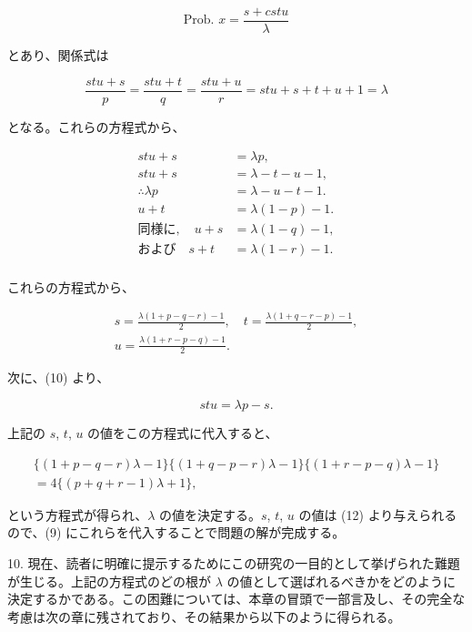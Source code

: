 \documentclass[a4paper,11pt,openany]{ltjsbook}
\begin{document}
\[
  \text{Prob. } x = \frac{s + cstu}{\lambda} \tag{9}
\]

とあり、関係式は

\[
  \frac{stu + s}{p} = \frac{stu + t}{q} = \frac{stu + u}{r} = stu + s + t + u + 1 = \lambda \tag{10}
\]

となる。これらの方程式から、

\begin{align*}
                      stu + s &= \lambda p,           \tag{11} \\
                      stu + s &= \lambda - t - u - 1, \\
         \therefore \lambda p &= \lambda - u - t - 1. \\
                        u + t &= \lambda(1 - p) - 1.  \\
\text{同様に},\quad u + s &= \lambda(1 - q) - 1,  \\
\text{および}\quad        s + t &= \lambda(1 - r) - 1.  \\
\end{align*}

これらの方程式から、

\begin{gather*}
  s = \frac{\lambda(1 + p - q - r) - 1}{2},  \quad
  t = \frac{\lambda(1 + q - r - p) - 1}{2},  \\
  u = \frac{\lambda(1 + r - p - q) - 1}{2}.  \tag{12}
\end{gather*}

次に、(10) より、

\[
  stu = \lambda p - s.
\]

上記の $s$, $t$, $u$ の値をこの方程式に代入すると、

\begin{multline*}
  \{(1 + p - q - r)\lambda - 1\}
  \{(1 + q - p - r)\lambda - 1\}
  \{(1 + r - p - q)\lambda - 1\}\\
=4\{(p + q + r - 1)\lambda + 1\}, \tag{13}
\end{multline*}

という方程式が得られ、$\lambda$ の値を決定する。$s$, $t$, $u$ の値は (12) より与えられるので、(9) にこれらを代入することで問題の解が完成する。

10. 現在、読者に明確に提示するためにこの研究の一目的として挙げられた難題が生じる。上記の方程式のどの根が $\lambda$ の値として選ばれるべきかをどのように決定するかである。この困難については、本章の冒頭で一部言及し、その完全な考慮は次の章に残されており、その結果から以下のように得られる。
\end{document}
